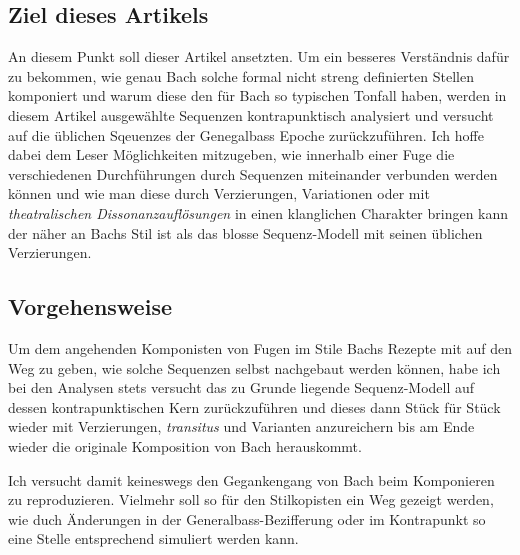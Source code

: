 \subsection{Ziel dieses Artikels}

An diesem Punkt soll dieser Artikel ansetzten.
Um ein besseres Verständnis dafür zu bekommen, wie genau Bach solche formal nicht streng definierten Stellen komponiert und warum diese den für Bach so typischen Tonfall haben, werden in diesem Artikel ausgewählte Sequenzen kontrapunktisch analysiert und versucht auf die üblichen Sqeuenzes der Genegalbass Epoche zurückzuführen.
Ich hoffe dabei dem Leser Möglichkeiten mitzugeben, wie innerhalb einer Fuge die verschiedenen Durchführungen durch Sequenzen miteinander verbunden werden können und wie man diese durch Verzierungen, Variationen oder mit \emph{theatralischen Dissonanzauflösungen}\autocite[208-219]{heinichen:general-bass,menke:kontrapunkt2} in einen klanglichen Charakter bringen kann der näher an Bachs Stil ist als das blosse Sequenz-Modell mit seinen üblichen Verzierungen.


\subsection{Vorgehensweise}

Um dem angehenden Komponisten von Fugen im Stile Bachs Rezepte mit auf den Weg zu geben, wie solche Sequenzen selbst nachgebaut werden können, habe ich bei den Analysen stets versucht das zu Grunde liegende Sequenz-Modell auf dessen kontrapunktischen Kern zurückzuführen und dieses dann Stück für Stück wieder mit Verzierungen, \emph{transitus } und Varianten anzureichern bis am Ende wieder die originale Komposition von Bach herauskommt.

Ich versucht damit keineswegs den Gegankengang von Bach beim Komponieren zu reproduzieren.
Vielmehr soll so für den Stilkopisten ein Weg gezeigt werden, wie duch Änderungen in der Generalbass-Bezifferung oder im Kontrapunkt so eine Stelle entsprechend simuliert werden kann.
